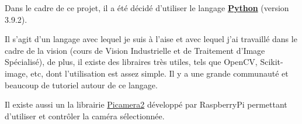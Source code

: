Dans le cadre de ce projet, il a été décidé d'utiliser le langage \underline{\textbf{Python}} (version 3.9.2).

Il s'agit d'un langage avec lequel je suis à l'aise et avec lequel j'ai travaillé dans le cadre
de la vision (cours de Vision Industrielle et de Traitement d'Image Spécialisé), de plus, il existe des libraires très utiles, tels que
OpenCV, Scikit-image, etc, dont l'utilisation est assez simple. Il y a une grande communauté et beaucoup de tutoriel autour de ce langage.

Il existe aussi un la librairie \underline{Picamera2} développé par RaspberryPi permettant d'utiliser et contrôler la caméra sélectionnée.

